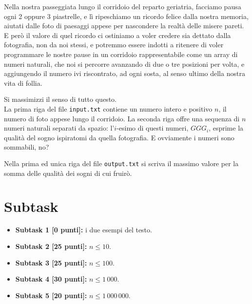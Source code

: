 \renewcommand{\nomebreve}{two\_three\_steps}
\renewcommand{\titolo}{Better two or three steps?}

\introduzione{}

Nella nostra passeggiata lungo il corridoio del reparto geriatria,
facciamo pausa ogni 2 oppure 3 piastrelle, e lì ripeschiamo un ricordo felice dalla nostra memoria, aiutati dalle foto di paesaggi appese per nascondere la realtà delle misere pareti.
E però il valore di quel ricordo ci ostiniamo a voler credere sia dettato dalla fotografia, non da noi stessi, e potremmo essere indotti a ritenere di voler programmare le nostre pause in un corridoio rappresentabile come un array di numeri naturali, che noi si percorre avanzando di due o tre posizioni per volta, e aggiungendo il numero ivi riscontrato, ad ogni sosta, al senso ultimo della nostra vita di follia.


  Si massimizzi il senso di tutto questo.\\


La prima riga del file \verb'input.txt' contiene un numero intero e positivo $n$, il numero di foto appese lungo il corridoio.
La seconda riga offre una sequenza di $n$ numeri naturali separati da spazio:
l'$i$-esimo di questi numeri, $GGG_i$, esprime la qualità del sogno ispiratomi da quella fotografia. E ovviamente i numeri sono sommabili, no?

Nella prima ed unica riga del file \verb'output.txt'
si scriva il massimo valore per la somma delle qualità dei sogni di cui fruirò.\\



\section*{Subtask}

  \begin{itemize}
    \item \textbf{Subtask 1 [0 punti]:} i due esempi del testo.
    \item \textbf{Subtask 2 [25 punti]:} $n \leq 10$.
    \item \textbf{Subtask 3 [25 punti]:} $n \leq 100$.
    \item \textbf{Subtask 4 [30 punti]:} $n \leq 1\,000$.
    \item \textbf{Subtask 5 [20 punti]:} $n \leq 1\,000\,000$.
  \end{itemize}
  
